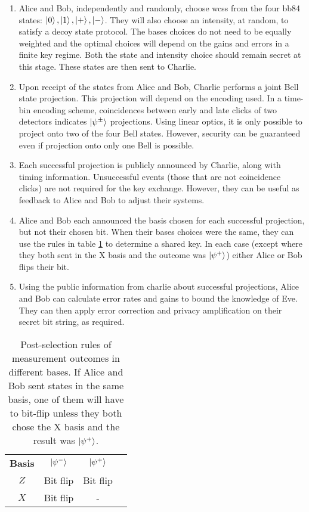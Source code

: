 \begin{enumerate}
	\item {} Alice and Bob, independently and randomly, choose \acp{wcs} from the four \ac{bb84} states: $\ket{0}, \ket{1}, \ket{+}, \ket{-}$. They will also choose an intensity, at random, to satisfy a decoy state protocol. The bases choices do not need to be equally weighted and the optimal choices will depend on the gains and errors in a finite key regime. Both the state and intensity choice should remain secret at this stage. These states are then sent to Charlie. 
	\item {} Upon receipt of the states from Alice and Bob, Charlie performs a joint Bell state projection. This projection will depend on the encoding used. In a time-bin encoding scheme, coincidences between early and late clicks of two detectors indicates $\ket{\psi^\pm}$ projections. Using linear optics, it is only possible to project onto two of the four Bell states. However, security can be guaranteed even if projection onto only one Bell is possible.
	\item {} Each successful projection is publicly announced by Charlie, along with timing information. Unsuccessful events (those that are not coincidence clicks) are not required for the key exchange. However, they can be useful as feedback to Alice and Bob to adjust their systems.
	\item {} Alice and Bob each announced the basis chosen for each successful projection, but not their chosen bit. When their bases choices were the same, they can use the rules in table \ref{tab:mdi-outcomes} to determine a shared key. In each case (except where they both sent in the X basis and the outcome was $\ket{\psi^+}$) either Alice or Bob flips their bit. 
	\item {} Using the public information from charlie about successful projections, Alice and Bob can calculate error rates and gains to bound the knowledge of Eve. They can then  apply error correction and privacy amplification on their secret bit string, as required.
\end{enumerate}

\begin{table}[t]
\centering
\begin{tabular}{@{}cccc@{}}
\textbf{Basis}      & $\ket{\psi^-}$     & $\ket{\psi^+}$        \\
$Z$              & Bit flip           & Bit flip                \\
$X$              & Bit flip           & \multicolumn{1}{c}{-}   \\
\end{tabular}
\caption[Measurement outcomes in MDI-QKD]{Post-selection rules of measurement outcomes in different bases. If Alice and Bob sent states in the same basis, one of them will have to bit-flip unless they both chose the X basis and the result was $\ket{\psi^+}$.}
\label{tab:mdi-outcomes}
\end{table}

